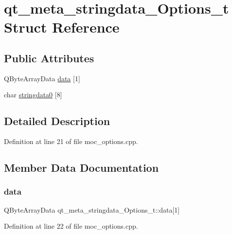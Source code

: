 \hypertarget{structqt__meta__stringdata___options__t}{}\section{qt\+\_\+meta\+\_\+stringdata\+\_\+\+Options\+\_\+t Struct Reference}
\label{structqt__meta__stringdata___options__t}
\subsection*{Public Attributes}
\begin{DoxyCompactItemize}
\item 
Q\+Byte\+Array\+Data \mbox{\hyperlink{structqt__meta__stringdata___options__t_aab27f9723ba23df332a060e1f0150dc6}{data}} \mbox{[}1\mbox{]}
\item 
char \mbox{\hyperlink{structqt__meta__stringdata___options__t_aa4baf2a8e48fc69ab81a2e828077d167}{stringdata0}} \mbox{[}8\mbox{]}
\end{DoxyCompactItemize}


\subsection{Detailed Description}


Definition at line 21 of file moc\+\_\+options.\+cpp.



\subsection{Member Data Documentation}
\mbox{\label{structqt__meta__stringdata___options__t_aab27f9723ba23df332a060e1f0150dc6}} 
\subsubsection{\texorpdfstring{data}{data}}
{\footnotesize\ttfamily Q\+Byte\+Array\+Data qt\+\_\+meta\+\_\+stringdata\+\_\+\+Options\+\_\+t\+::data\mbox{[}1\mbox{]}}



Definition at line 22 of file moc\+\_\+options.\+cpp.

